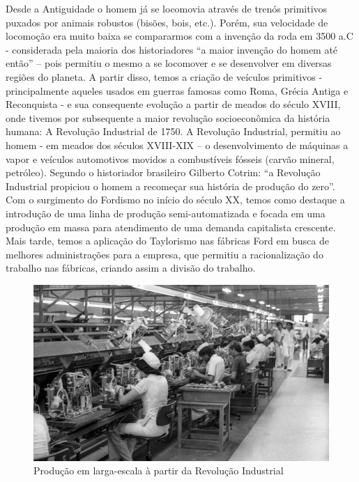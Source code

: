 \documentclass[a4paper, 12pt]{article}
\begin{document}
    Desde a Antiguidade o homem já se locomovia através de trenós primitivos puxados por animais robustos (bisões, bois, etc.). Porém, sua velocidade de locomoção era muito baixa se compararmos com a invenção da roda em 3500 a.C -  considerada pela maioria dos historiadores “a maior invenção do homem até então” – pois permitiu o mesmo a se locomover e se desenvolver em diversas regiões do planeta.
    A partir disso, temos a criação de veículos primitivos - principalmente aqueles usados em guerras famosas como Roma, Grécia Antiga e Reconquista - e sua consequente evolução a partir de meados do século XVIII, onde tivemos por subsequente a maior revolução socioeconômica da história humana: A Revolução Industrial de 1750.
    A Revolução Industrial, permitiu ao homem - em meados dos séculos XVIII-XIX – o desenvolvimento de máquinas a vapor e veículos automotivos movidos a combustíveis fósseis (carvão mineral, petróleo). Segundo o historiador brasileiro Gilberto Cotrim: “a Revolução Industrial propiciou o homem a recomeçar sua história de produção do zero”.
    Com o surgimento do Fordismo no início do século XX, temos como destaque a introdução de uma linha de produção semi-automatizada e focada em uma produção em massa para atendimento de uma demanda capitalista crescente. Mais tarde, temos a aplicação do Taylorismo nas fábricas Ford em busca de melhores administrações para a empresa, que permitiu a racionalização do trabalho nas fábricas, criando assim a divisão do trabalho.
    
    \begin{figure}[htb]
        \centering
        \includegraphics[scale=0.5]{0001.png}
        \caption{Produção em larga-escala à partir da Revolução Industrial}
        \label{fig:my_label}
    \end{figure}
    
\end{document}
